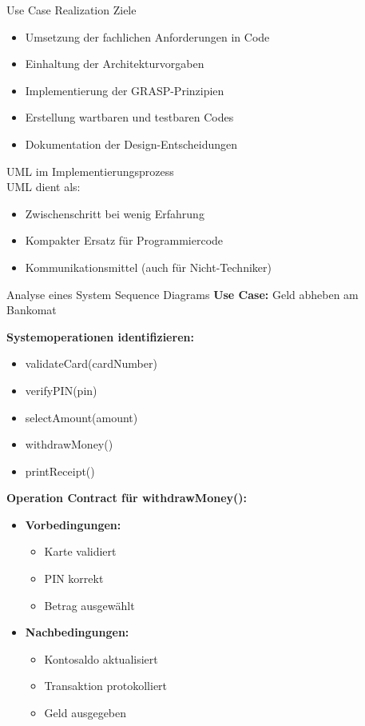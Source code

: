 \begin{theorem}{Use Case Realization Ziele}
\begin{itemize}
    \item Umsetzung der fachlichen Anforderungen in Code
    \item Einhaltung der Architekturvorgaben
    \item Implementierung der GRASP-Prinzipien
    \item Erstellung wartbaren und testbaren Codes
    \item Dokumentation der Design-Entscheidungen
\end{itemize}
\end{theorem}

\begin{definition}{UML im Implementierungsprozess}\\
UML dient als:
\begin{itemize}
    \item Zwischenschritt bei wenig Erfahrung
    \item Kompakter Ersatz für Programmiercode
    \item Kommunikationsmittel (auch für Nicht-Techniker)
\end{itemize}
\end{definition}

\begin{example2}{Analyse eines System Sequence Diagrams}
\textbf{Use Case:} Geld abheben am Bankomat

\textbf{Systemoperationen identifizieren:}
\begin{itemize}
    \item validateCard(cardNumber)
    \item verifyPIN(pin)
    \item selectAmount(amount)
    \item withdrawMoney()
    \item printReceipt()
\end{itemize}

\textbf{Operation Contract für withdrawMoney():}
\begin{itemize}
    \item \textbf{Vorbedingungen:}
    \begin{itemize}
        \item Karte validiert
        \item PIN korrekt
        \item Betrag ausgewählt
    \end{itemize}
    \item \textbf{Nachbedingungen:}
    \begin{itemize}
        \item Kontosaldo aktualisiert
        \item Transaktion protokolliert
        \item Geld ausgegeben
    \end{itemize}
\end{itemize}
\end{example2}

